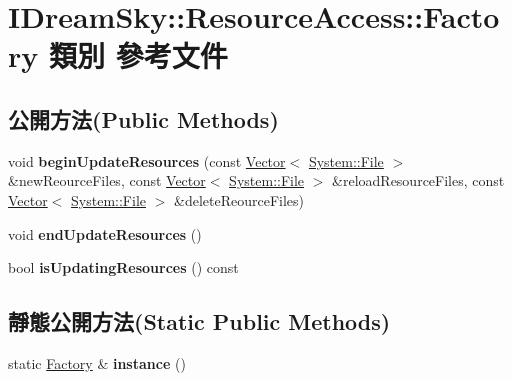 \hypertarget{class_i_dream_sky_1_1_resource_access_1_1_factory}{}\section{I\+Dream\+Sky\+:\+:Resource\+Access\+:\+:Factory 類別 參考文件}
\label{class_i_dream_sky_1_1_resource_access_1_1_factory}
\subsection*{公開方法(Public Methods)}
\begin{DoxyCompactItemize}
\item 
void {\bfseries begin\+Update\+Resources} (const \hyperlink{class_i_dream_sky_1_1_vector}{Vector}$<$ \hyperlink{class_i_dream_sky_1_1_system_1_1_file}{System\+::\+File} $>$ \&new\+Reource\+Files, const \hyperlink{class_i_dream_sky_1_1_vector}{Vector}$<$ \hyperlink{class_i_dream_sky_1_1_system_1_1_file}{System\+::\+File} $>$ \&reload\+Resource\+Files, const \hyperlink{class_i_dream_sky_1_1_vector}{Vector}$<$ \hyperlink{class_i_dream_sky_1_1_system_1_1_file}{System\+::\+File} $>$ \&delete\+Reource\+Files)\hypertarget{class_i_dream_sky_1_1_resource_access_1_1_factory_ad6e6a9cafa12c57971906f8e6f38943b}{}\label{class_i_dream_sky_1_1_resource_access_1_1_factory_ad6e6a9cafa12c57971906f8e6f38943b}

\item 
void {\bfseries end\+Update\+Resources} ()\hypertarget{class_i_dream_sky_1_1_resource_access_1_1_factory_add020acb918bfaeae32ef48842cd4e9d}{}\label{class_i_dream_sky_1_1_resource_access_1_1_factory_add020acb918bfaeae32ef48842cd4e9d}

\item 
bool {\bfseries is\+Updating\+Resources} () const \hypertarget{class_i_dream_sky_1_1_resource_access_1_1_factory_adb0bafd78cfac5fe795b1688e0b2f33c}{}\label{class_i_dream_sky_1_1_resource_access_1_1_factory_adb0bafd78cfac5fe795b1688e0b2f33c}

\end{DoxyCompactItemize}
\subsection*{靜態公開方法(Static Public Methods)}
\begin{DoxyCompactItemize}
\item 
static \hyperlink{class_i_dream_sky_1_1_resource_access_1_1_factory}{Factory} \& {\bfseries instance} ()\hypertarget{class_i_dream_sky_1_1_resource_access_1_1_factory_a54e05402ab08c2a2041e5d1877566357}{}\label{class_i_dream_sky_1_1_resource_access_1_1_factory_a54e05402ab08c2a2041e5d1877566357}

\end{DoxyCompactItemize}
